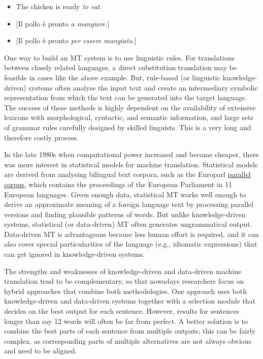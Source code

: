 \documentclass[]{../../metanetpaper}
\begin{document}
\begin{multicols}{2}
\begin{itemize}
\item The chicken is ready \emph{to eat}.
\item {[}Il pollo  \`{e} pronto \emph{a mangiare}.{]}
\item {[}Il pollo  \`{e} pronto \emph{per essere mangiato}.{]}
\end{itemize}



One way to build an MT system is to use linguistic rules. For translations between closely related languages, a direct substitution translation may be feasible in cases like the above example. But, rule-based (or linguistic knowledge-driven) systems often analyse the input text and create an intermediary symbolic representation from which the text can be generated into the target language. The success of these methods is highly dependent on the availability of extensive lexicons with morphological, syntactic, and semantic information, and large sets of grammar rules carefully designed by skilled linguists. This is a very long and therefore costly process.

In the late 1980s when computational power increased and became cheaper, there was more interest in statistical models for machine translation. Statistical models are derived from analysing bilingual text corpora, such as the Europarl \underline{parallel corpus}, which contains the proceedings of the European Parliament in 11 European languages. Given enough data, statistical MT works well enough to derive an approximate meaning of a foreign language text by processing parallel versions and finding plausible patterns of words. But unlike knowledge-driven systems, statistical (or data-driven) MT often generates ungrammatical output. Data-driven MT is advantageous because less human effort is required, and it can also cover special particularities of the language (e.g., idiomatic expressions) that can get ignored in knowledge-driven systems. 

The strengths and weaknesses of knowledge-driven and data-driven machine translation tend to be complementary, so that nowadays researchers focus on hybrid approaches that combine both methodologies. One approach uses both knowledge-driven and data-driven systems together with a selection module that decides on the best output for each sentence. However, results for sentences longer than say 12 words will often be far from perfect. A better solution is to combine the best parts of each sentence from multiple outputs; this can be fairly complex, as corresponding parts of multiple alternatives are not always obvious and need to be aligned. 


\end{multicols}
\end{document}
